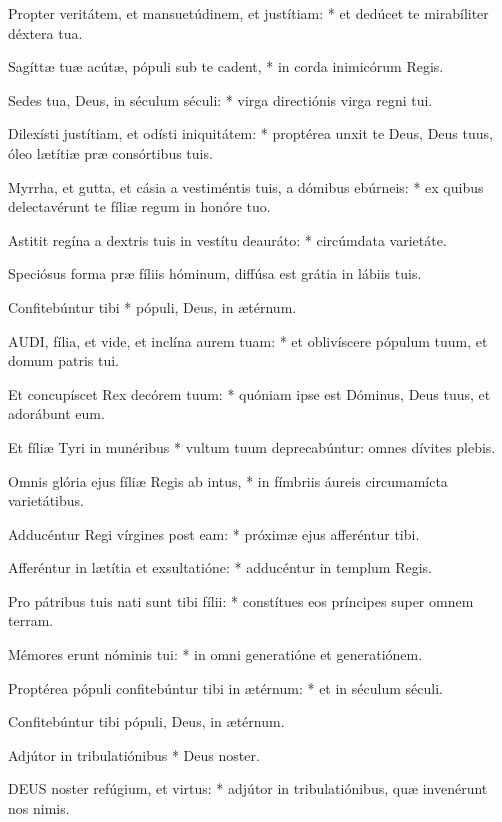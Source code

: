 Propter veritátem, et mansuetúdinem, et justítiam: * et dedúcet te mirabíliter déxtera tua.

Sagíttæ tuæ acútæ, pópuli sub te cadent, * in corda inimicórum Regis.

Sedes tua, Deus, in séculum séculi: * virga directiónis virga regni tui.

Dilexísti justítiam, et odísti iniquitátem: * proptérea unxit te Deus, Deus tuus, óleo lætítiæ præ consórtibus tuis.

Myrrha, et gutta, et cásia a vestiméntis tuis, a dómibus ebúrneis: * ex quibus delectavérunt te fíliæ regum in honóre tuo.

Astitit regína a dextris tuis in vestítu deauráto: * circúmdata varietáte.

 Speciósus forma præ fíliis hóminum, diffúsa est grátia in lábiis tuis.

 Confitebúntur tibi * pópuli, Deus, in ætérnum.


\lettrine[lines=2]{A}{UDI}, fília, et vide, et inclína aurem tuam: * et oblivíscere pópulum tuum, et domum patris tui.

Et concupíscet Rex decórem tuum: * quóniam ipse est Dóminus, Deus tuus, et adorábunt eum.

Et fíliæ Tyri in munéribus * vultum tuum deprecabúntur: omnes dívites plebis.

Omnis glória ejus fíliæ Regis ab intus, * in fímbriis áureis circumamícta varietátibus.

Adducéntur Regi vírgines post eam: * próximæ ejus afferéntur tibi.

Afferéntur in lætítia et exsultatióne: * adducéntur in templum Regis.

Pro pátribus tuis nati sunt tibi fílii: * constítues eos príncipes super omnem terram.

Mémores erunt nóminis tui: * in omni generatióne et generatiónem.

Proptérea pópuli confitebúntur tibi in ætérnum: * et in séculum séculi.

 Confitebúntur tibi pópuli, Deus, in ætérnum.

 Adjútor in tribulatiónibus * Deus noster.


\lettrine[lines=2]{D}{EUS} noster refúgium, et virtus: * adjútor in tribulatiónibus, quæ invenérunt nos nimis.

